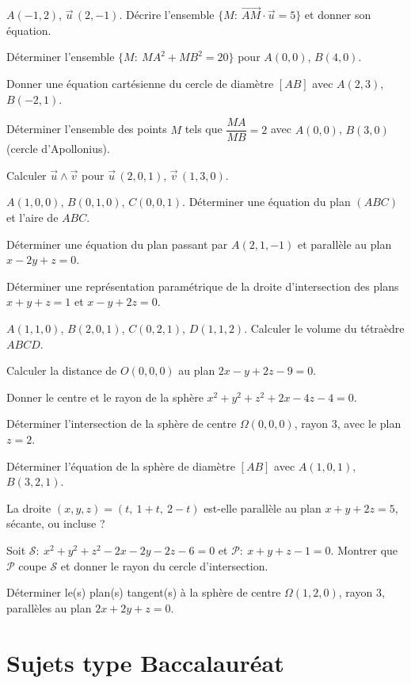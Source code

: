 \exo{} $A(-1,2)$, $\vec u\,(2,-1)$. Décrire l'ensemble $\{M:\ \overrightarrow{AM}\cdot\vec u=5\}$ et donner son équation.

\exo{} Déterminer l'ensemble $\{M:\ MA^{2}+MB^{2}=20\}$ pour $A(0,0)$, $B(4,0)$.

\exo{} Donner une équation cartésienne du cercle de diamètre $[AB]$ avec $A(2,3)$, $B(-2,1)$.

\exo{} Déterminer l'ensemble des points $M$ tels que $\dfrac{MA}{MB}=2$ avec $A(0,0)$, $B(3,0)$ (cercle d'Apollonius).

\exo{} Calculer $\vec u\wedge\vec v$ pour $\vec u\,(2,0,1)$, $\vec v\,(1,3,0)$.

\exo{} $A(1,0,0)$, $B(0,1,0)$, $C(0,0,1)$. Déterminer une équation du plan $(ABC)$ et l'aire de $ABC$.

\exo{} Déterminer une équation du plan passant par $A(2,1,-1)$ et parallèle au plan $x-2y+z=0$.

\exo{} Déterminer une représentation paramétrique de la droite d'intersection des plans $x+y+z=1$ et $x-y+2z=0$.

\exo{} $A(1,1,0)$, $B(2,0,1)$, $C(0,2,1)$, $D(1,1,2)$. Calculer le volume du tétraèdre $ABCD$.

\exo{} Calculer la distance de $O(0,0,0)$ au plan $2x-y+2z-9=0$.

\exo{} Donner le centre et le rayon de la sphère $x^{2}+y^{2}+z^{2}+2x-4z-4=0$.

\exo{} Déterminer l'intersection de la sphère de centre $\Omega(0,0,0)$, rayon $3$, avec le plan $z=2$.

\exo{} Déterminer l'équation de la sphère de diamètre $[AB]$ avec $A(1,0,1)$, $B(3,2,1)$.

\exo{} La droite $(x,y,z)=(t,\ 1+t,\ 2-t)$ est-elle parallèle au plan $x+y+2z=5$, sécante, ou incluse ?

\exo{} Soit $\mathcal S:\ x^{2}+y^{2}+z^{2}-2x-2y-2z-6=0$ et $\mathcal P:\ x+y+z-1=0$. Montrer que $\mathcal P$ coupe $\mathcal S$ et donner le rayon du cercle d'intersection.

\exo{} Déterminer le(s) plan(s) tangent(s) à la sphère de centre $\Omega(1,2,0)$, rayon $3$, parallèles au plan $2x+2y+z=0$.

\section{Sujets type Baccalauréat}

